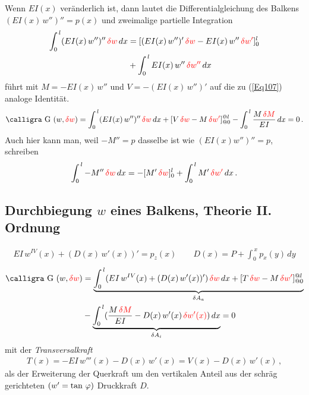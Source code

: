 {{{{Wenn $EI(x)$ ver\"{a}nderlich ist, dann lautet die Differentialgleichung des Balkens $(EI(x)\,w'')'' = p(x)$ und zweimalige partielle Integration
\begin{align}
\int_0^{\,l} (EI(x)\,w'')''\,\textcolor{red}{\delta w}\,dx &= [(EI(x)\,w'')'\,\textcolor{red}{\delta w} - EI(x)\,w''\,\textcolor{red}{\delta w'}]_0^l \nonumber \\
&+ \int_0^{\,l} EI(x)\,w''\,\textcolor{red}{\delta w''}\,dx
\end{align}
f\"{u}hrt mit $M = -EI(x)\,w''$ und $V = -(EI(x)\,w'')'$ auf die zu (\ref{Eq107}) analoge Identit\"{a}t.
\begin{align}
\text{\normalfont\calligra G\,\,}(w,\textcolor{red}{\delta w}) =\int_0^{\,l} (EI(x)\,w'')''\,\textcolor{red}{\delta w}\,dx + [V\,\textcolor{red}{\delta w} - M\,\textcolor{red}{\delta w'}]_{@0}^{@l}  - \int_0^{\,l} \frac{M\,\textcolor{red}{\delta M}}{EI}\,dx = 0\,.
\end{align}
Auch hier kann man, weil $-M'' = p$ dasselbe ist wie $(EI(x) w'')'' = p$, schreiben
\begin{align}
\int_0^{\,l} -M''\,\textcolor{red}{\delta w}\,dx = - [M'\,\textcolor{red}{\delta w}]_0^l + \int_0^{\,l} M'\,\textcolor{red}{\delta w'}\,dx\,.
\end{align}
{\textcolor{sectionTitleBlue}{\subsection{Durchbiegung $w$ eines Balkens, Theorie II. Ordnung}}}
\vspace{-0.7cm}
\begin{align}
EI\,w^{IV}(x) + (D(x)\,w'(x))' = p_z(x) \qquad D(x) = P + \int_0^{\,x} p_x(y)\,dy
\end{align}
\begin{align}
\text{\normalfont\calligra G\,\,}(w,\textcolor{red}{\delta w}) &= \underbrace{\int_0^{\,l} (EI\,w^{IV}(x) + (D(x)\,w'(x))') \,\textcolor{red}{\delta w}\,dx + [T\,\textcolor{red}{\delta w} - M\,\textcolor{red}{\delta w'}]_{@0}^{@l}}_{\delta A_a} \nn \\
&- \underbrace{\int_0^{\,l} (\frac{M\,\textcolor{red}{\delta M}}{EI} - D(x)\,w'(x)\,\textcolor{red}{\delta w'(x)})\,dx}_{\delta A_i} = 0
\end{align}
mit der {\em Transversalkraft\/}
\begin{align}
 T(x) = - EI\,w'''(x) - D(x)\,w'(x) = V(x) - D(x)\,w'(x)\,,
 \end{align}
als der Erweiterung der Querkraft um den vertikalen Anteil aus der schr\"{a}g gerichteten $(w' = \tan\,\varphi)$ Druckkraft $D$.

}}}}
